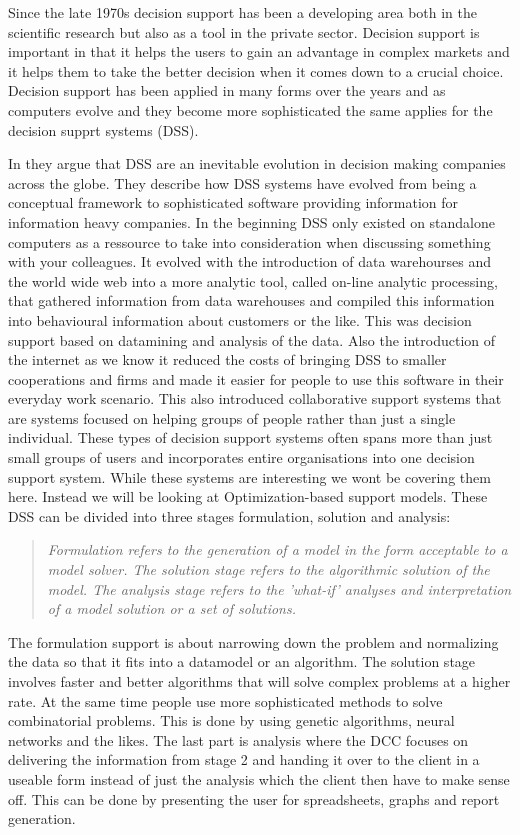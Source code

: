Since the late 1970s decision support has been a developing area both in the scientific research but also as a tool in the private sector. Decision support is important in that it helps the users to gain an advantage in complex markets and it helps them to take the better decision when it comes down to a crucial choice. Decision support has been applied in many forms over the years and as computers evolve and they become more sophisticated the same applies for the decision supprt systems (DSS).

In \cite{shim2002past} they argue that DSS are an inevitable evolution in decision making companies across the globe. They describe how DSS systems have evolved from being a conceptual framework to sophisticated software providing information for information heavy companies. In the beginning DSS only existed on standalone computers as a ressource to take into consideration when discussing something with your colleagues. It evolved with the introduction of data warehourses and the world wide web into a more analytic tool, called on-line analytic processing, that gathered information from data warehouses and compiled this information into behavioural information about customers or the like. This was decision support based on datamining and analysis of the data. Also the introduction of the internet as we know it reduced the costs of bringing DSS to smaller cooperations and firms and made it easier for people to use this software in their everyday work scenario. This also introduced collaborative support systems that are systems focused on helping groups of people rather than just a single individual. These types of decision support systems often spans more than just small groups of users and incorporates entire organisations into one decision support system. While these systems are interesting we wont be covering them here. Instead we will be looking at Optimization-based support models. These DSS can be divided into three stages formulation, solution and analysis\cite{shim2002past}:
\begin{quotation}
\textit{Formulation refers to the generation of a model in the form acceptable to a model solver. The solution stage refers to the algorithmic solution of the model. The analysis stage refers to the 'what-if' analyses and interpretation of a model solution or a set of solutions.}
\end{quotation}
The formulation support is about narrowing down the problem and normalizing the data so that it fits into a datamodel or an algorithm. The solution stage involves faster and better algorithms that will solve complex problems at a higher rate. At the same time people use more sophisticated methods to solve combinatorial problems. This is done by using genetic algorithms, neural networks and the likes\cite{shim2002past}. The last part is analysis where the DCC focuses on delivering the information from stage 2 and handing it over to the client in a useable form instead of just the analysis which the client then have to make sense off. This can be done by presenting the user for spreadsheets, graphs and report generation.

